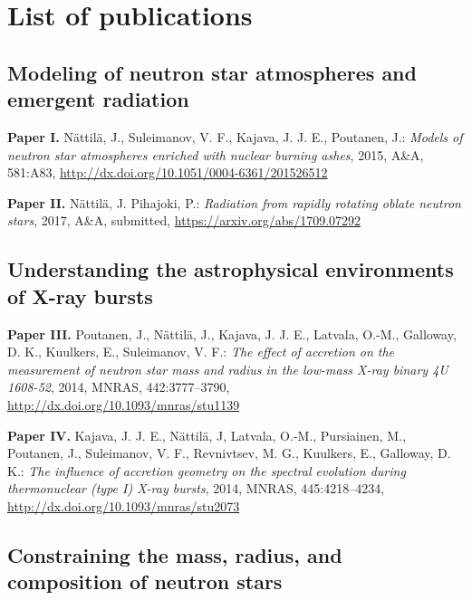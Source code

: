 \chapter*{List of publications}


\vspace{-0.3cm}
\section*{Modeling of neutron star atmospheres and emergent radiation}

\hspace{15pt}\textbf{Paper I.} Nättilä, J., Suleimanov, V. F., Kajava, J. J. E., Poutanen, J.:
\textit{Models of neutron star atmospheres enriched with nuclear burning ashes},
2015, A\&A, 581:A83, 
\url{http://dx.doi.org/10.1051/0004-6361/201526512}

\vspace{0.3cm}
\textbf{Paper II.} Nättilä, J. Pihajoki, P.: 
\textit{Radiation from rapidly rotating oblate neutron stars}, 
2017, A\&A, submitted, 
\url{https://arxiv.org/abs/1709.07292}



\vspace{1.0cm}
\section*{Understanding the astrophysical environments of X-ray bursts}

\hspace{15pt}\textbf{Paper III.} Poutanen, J., Nättilä, J., Kajava, J. J. E., Latvala, O.-M., Galloway, D. K., Kuulkers, E., Suleimanov, V. F.: 
\textit{The effect of accretion on the measurement of neutron star mass and radius in the low-mass X-ray binary 4U 1608-52}, 
2014, MNRAS, 442:3777–3790, 
\url{http://dx.doi.org/10.1093/mnras/stu1139}

\vspace{0.3cm}
\textbf{Paper IV.} Kajava, J. J. E., Nättilä, J, Latvala, O.-M., Pursiainen, M., Poutanen, J., Suleimanov, V. F., Revnivtsev, M. G., Kuulkers, E., Galloway, D. K.: 
\textit{The influence of accretion geometry on the spectral evolution during thermonuclear (type I) X-ray bursts}, 
2014, MNRAS, 445:4218–4234, 
\url{http://dx.doi.org/10.1093/mnras/stu2073}



\vspace{1.0cm}
\section*{Constraining the mass, radius, and composition of neutron stars}

